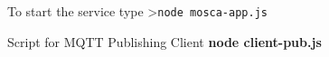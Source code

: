\documentclass[16pt]{article}
\begin{document}
\begin{enumerate}





To start the service type \textgreater{}\texttt{node mosca-app.js}

Script for MQTT Publishing Client \textbf{node client-pub.js}

 

\end{enumerate}
\end{document}
